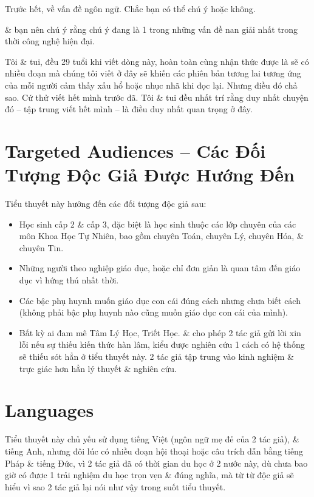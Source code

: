 \documentclass[12pt,twoside]{book}
\begin{document}
Trước hết, về vấn đề ngôn ngữ. Chắc bạn có thể chú ý hoặc không. 

\& bạn nên chú ý rằng chú ý đang là 1 trong những vấn đề nan giải nhất trong thời công nghệ hiện đại.

Tôi \& tui, đều 29 tuổi khi viết dòng này, hoàn toàn cùng nhận thức được là sẽ có nhiều đoạn mà chúng tôi viết ở đây sẽ khiến các phiên bản tương lai tương ứng của mỗi người cảm thấy xấu hổ hoặc nhục nhã khi đọc lại. Nhưng điều đó chả sao. Cứ thử viết hết mình trước đã. Tôi \& tui đều nhất trí rằng duy nhất chuyện đó -- tập trung viết hết mình -- là điều duy nhất quan trọng ở đây.


\section*{Targeted Audiences -- Các Đối Tượng Độc Giả Được Hướng Đến}
Tiểu thuyết này hướng đến các đối tượng độc giả sau:
\begin{itemize}
	\item Học sinh cấp 2 \& cấp 3, đặc biệt là học sinh thuộc các lớp chuyên của các môn Khoa Học Tự Nhiên, bao gồm chuyên Toán, chuyên Lý, chuyên Hóa, \& chuyên Tin.
	\item Những người theo nghiệp giáo dục, hoặc chỉ đơn giản là quan tâm đến giáo dục vì hứng thú nhất thời.
	\item Các bậc phụ huynh muốn giáo dục con cái đúng cách nhưng chưa biết cách (không phải bậc phụ huynh nào cũng muốn giáo dục con cái của mình).
	\item Bất kỳ ai đam mê Tâm Lý Học, Triết Học. \& cho phép 2 tác giả gửi lời xin lỗi nếu sự thiếu kiến thức hàn lâm, kiểu được nghiên cứu 1 cách có hệ thống sẽ thiếu sót hẳn ở tiểu thuyết này. 2 tác giả tập trung vào kinh nghiệm \& trực giác hơn hẳn lý thuyết \& nghiên cứu.
\end{itemize}


\section*{Languages}
Tiểu thuyết này chủ yếu sử dụng tiếng Việt (ngôn ngữ mẹ đẻ của 2 tác giả), \& tiếng Anh, nhưng đôi lúc có nhiều đoạn hội thoại hoặc câu trích dẫn bằng tiếng Pháp \& tiếng Đức, vì 2 tác giả đã có thời gian du học ở 2 nước này, dù chưa bao giờ có được 1 trải nghiệm du học trọn vẹn \& đúng nghĩa, mà từ từ độc giả sẽ hiểu vì sao 2 tác giả lại nói như vậy trong suốt tiểu thuyết.
\end{document}
